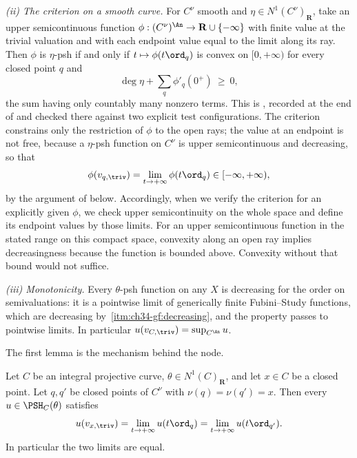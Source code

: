 \emph{(ii) The criterion on a smooth curve.}  For $C^\nu$ smooth and
$\eta\in N^1(C^\nu)_{\mathbf R}$, take an upper semicontinuous function
$\phi:(C^\nu)^{\An}\to\mathbf R\cup\{-\infty\}$ with finite value at the
trivial valuation and with each endpoint value equal to the limit along
its ray.  Then $\phi$ is $\eta$-psh if and only
if $t\mapsto\phi(t\ord_q)$ is convex on $[0,+\infty)$ for every closed
point $q$ and
\[
 \deg\eta+\sum_q\phi'_q(0^+)\ \ge\ 0 ,
\]
the sum having only countably many nonzero terms.  This is
\cite[Example~4.13]{BJ22}, recorded at the end of
 and checked there against two explicit test
configurations.  The criterion constrains only the restriction of $\phi$
to the open rays; the value at an endpoint is not free, because a
$\eta$-psh function on $C^\nu$ is upper semicontinuous and decreasing, so that
\[
 \phi(v_{q,\triv})=\lim_{t\to+\infty}\phi(t\ord_q)\in[-\infty,+\infty),
\]
by the argument of  below.  Accordingly, when
we verify the criterion for an explicitly given $\phi$, we check upper
semicontinuity on the whole space and define its endpoint values by those
limits.  For an upper semicontinuous function in the stated range on this
compact space, convexity along an open ray implies decreasingness because
the function is bounded above.  Convexity without that bound would not
suffice.

\emph{(iii) Monotonicity.}  Every $\theta$-psh function on any $X$ is
decreasing for the order on semivaluations: it is a pointwise limit of
generically finite Fubini--Study functions, which are decreasing by
\,\cref{itm:ch34-gf:decreasing}, and the
property passes to pointwise limits.  In particular
$u(v_{C,\triv})=\sup_{C^{\An}}u$.

The first lemma is the mechanism behind the node.

\begin{lemma}
\label{lem:ch45-branch-symmetry}
Let $C$ be an integral projective curve, $\theta\in N^1(C)_{\mathbf R}$,
and let $x\in C$ be a closed point.  Let $q,q'$ be closed points of
$C^\nu$ with $\nu(q)=\nu(q')=x$.  Then every $u\in\PSH_C(\theta)$
satisfies
\[
 u(v_{x,\triv})
 =\lim_{t\to+\infty}u(t\ord_{q})
 =\lim_{t\to+\infty}u(t\ord_{q'}) .
\]
In particular the two limits are equal.
\end{lemma}

